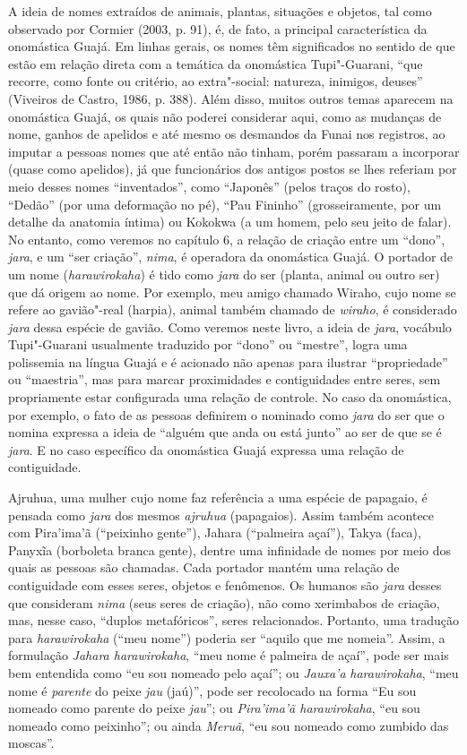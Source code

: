 A ideia de nomes extraídos de animais, plantas, situações e objetos, tal
como observado por Cormier (2003, p. 91), é, de fato, a principal
característica da onomástica Guajá. Em linhas gerais, os nomes têm
significados no sentido de que estão em relação direta com a temática da
onomástica Tupi"-Guarani, ``que recorre, como fonte ou critério, ao
extra"-social: natureza, inimigos, deuses'' (Viveiros de Castro, 1986, p.
388). Além disso, muitos outros temas aparecem na onomástica Guajá, os
quais não poderei considerar aqui, como as mudanças de nome, ganhos de
apelidos e até mesmo os desmandos da Funai nos registros, ao imputar a
pessoas nomes que até então não tinham, porém passaram a incorporar
(quase como apelidos), já que funcionários dos antigos postos se lhes
referiam por meio desses nomes ``inventados'', como ``Japonês'' (pelos
traços do rosto), ``Dedão'' (por uma deformação no pé), ``Pau Fininho''
(grosseiramente, por um detalhe da anatomia íntima) ou Kokokwa (a um
homem, pelo seu jeito de falar). No entanto, como veremos no capítulo 6,
a relação de criação entre um ``dono'', \emph{jara}, e um ``ser
criação'', \emph{nima}, é operadora da onomástica Guajá. O portador de
um nome (\emph{harawirokaha}) é tido como \emph{jara} do ser (planta,
animal ou outro ser) que dá origem ao nome. Por exemplo, meu amigo
chamado Wiraho, cujo nome se refere ao gavião"-real (harpia), animal
também chamado de \emph{wiraho}, é considerado \emph{jara} dessa espécie
de gavião. Como veremos neste livro, a ideia de \emph{jara}, vocábulo
Tupi"-Guarani usualmente traduzido por ``dono'' ou ``mestre'', logra uma
polissemia na língua Guajá e é acionado não apenas para ilustrar
``propriedade'' ou ``maestria'', mas para marcar proximidades e
contiguidades entre seres, sem propriamente estar configurada uma
relação de controle. No caso da onomástica, por exemplo, o fato de as
pessoas definirem o nominado como \emph{jara} do ser que o nomina
expressa a ideia de ``alguém que anda ou está junto'' ao ser de que se é
\emph{jara}. E no caso específico da onomástica Guajá expressa uma
relação de contiguidade.

Ajruhua, uma mulher cujo nome faz referência a uma espécie de papagaio,
é pensada como \emph{jara} dos mesmos \emph{ajruhua} (papagaios). Assim
também acontece com Pira'ima'ã (``peixinho gente''), Jahara (``palmeira
açaí''), Takya (faca), Panyxĩa (borboleta branca gente), dentre uma
infinidade de nomes por meio dos quais as pessoas são chamadas. Cada
portador mantém uma relação de contiguidade com esses seres, objetos e
fenômenos. Os humanos são \emph{jara} desses que consideram \emph{nima}
(seus seres de criação), não como xerimbabos de criação, mas, nesse
caso, ``duplos metafóricos'', seres relacionados. Portanto, uma tradução
para \emph{harawirokaha} (``meu nome'') poderia ser ``aquilo que me
nomeia''. Assim, a formulação \emph{Jahara harawirokaha}, ``meu nome é
palmeira de açaí'', pode ser mais bem entendida como ``eu sou nomeado
pelo açaí''; ou \emph{Jauxa'a} \emph{harawirokaha}, ``meu nome é
\emph{parente} do peixe \emph{jau} (jaú)'', pode ser recolocado na forma
``Eu sou nomeado como parente do peixe \emph{jau}''; ou \emph{Pira'ima'ã
harawirokaha}, ``eu sou nomeado como peixinho''; ou ainda \emph{Meruã},
``eu sou nomeado como zumbido das moscas''.

